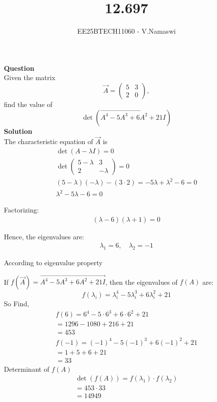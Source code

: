 \documentclass[journal]{IEEEtran}
\begin{document}

\vspace{3cm}

\title{12.697}
\author{EE25BTECH11060 - V.Namaswi}
{\let\newpage\relax\maketitle}
\renewcommand{\thefigure}{\theenumi}
\renewcommand{\thetable}{\theenumi}
\setlength{\intextsep}{10pt} %
\textbf{Question}\\ 
Given the matrix 
\[
\Vec{A} = \begin{pmatrix} 5 & 3 \\ 2 & 0 \end{pmatrix},
\] 
find the value of 
\[
\det(\Vec{A^4 - 5A^3 + 6A^2 + 21I})
\] 
\textbf{Solution}  \\
The characteristic equation of $\Vec{A}$ is
\begin{align}
\det(A - \lambda I) = 0\\
\det \begin{pmatrix} 5-\lambda & 3 \\ 2 & -\lambda \end{pmatrix} = 0\\
(5-\lambda)(-\lambda) - (3 \cdot 2) = -5\lambda + \lambda^2 - 6 = 0\\
\lambda^2 - 5\lambda - 6 = 0
\end{align}

Factorizing:
\begin{align}
(\lambda - 6)(\lambda + 1) = 0
\end{align}

Hence, the eigenvalues are:
\begin{align}
\lambda_1 = 6, \quad \lambda_2 = -1
\end{align}

According to eigenvalue property

If $f(\Vec{A}) = \Vec{A^4 - 5A^3 + 6A^2 + 21I} $, then the eigenvalues of $f(A)$ are:
\[
f(\lambda_i) = \lambda_i^4 - 5\lambda_i^3 + 6\lambda_i^2 + 21
\]
So Find,
\begin{align}
f(6) = 6^4 - 5 \cdot 6^3 + 6 \cdot 6^2 + 21  \\= 1296 - 1080 + 216 + 21  \\ = 453 \\
f(-1) = (-1)^4 - 5(-1)^3 + 6(-1)^2 + 21 \\  = 1 + 5 + 6 + 21 \\  = 33
\end{align}
 Determinant of $f(A)$  
\begin{align}
\det(f(A)) = f(\lambda_1) \cdot f(\lambda_2)\\ = 453 \cdot 33 \\
= 14949
\end{align}
\end{document}
